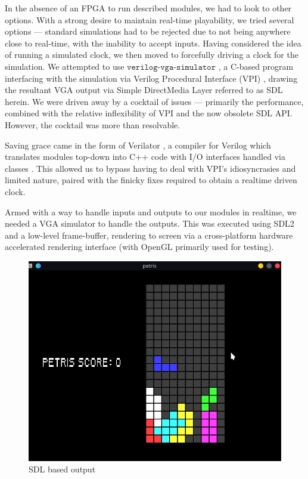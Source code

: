 In the absence of an FPGA to run described modules, 
we had to look to other options. With a strong desire to 
maintain real-time playability, we tried several options ---
standard simulations had to be rejected due to not being 
anywhere close to real-time, with the inability to accept inputs.
Having considered the idea of running a simulated clock, we then
moved to forcefully driving a clock for the simulation. We attempted
to use \(\texttt{verilog-vga-simulator}\) \cite{vga-simulator},
a C-based program interfacing with the simulation via 
Verilog Procedural Interface (VPI) \cite{vpi}, drawing the resultant
VGA output via Simple DirectMedia Layer \cite{sdl} referred to as 
SDL herein. We were driven away by a cocktail of issues --- primarily
the performance, combined with the relative inflexibility of VPI 
and the now obsolete \cite{sdl_obsolete} SDL API. However, the cocktail
was more than resolvable.

Saving grace came in the form of Verilator \cite{verilator}, a compiler for
Verilog which translates modules top-down into C++ code with
I/O interfaces handled via classes \cite{verilator-implement}. This allowed
us to bypass having to deal with VPI's idiosyncrasies and limited nature, paired
with the finicky fixes required to obtain a realtime driven clock.

Armed with a way to handle inputs and outputs to our modules in realtime, we 
needed a VGA simulator to handle the outputs. This was executed using
SDL2 \cite{sdl2} and a low-level frame-buffer, rendering to screen via 
a cross-platform hardware accelerated rendering interface (with OpenGL \cite{opengl}
primarily used for testing).

\begin{figure}[h]
    \centering
    \includegraphics[scale=0.6]{fig/ouput_screenshot.png}
    \caption{SDL based output}
\label{fig:output}
\end{figure}

